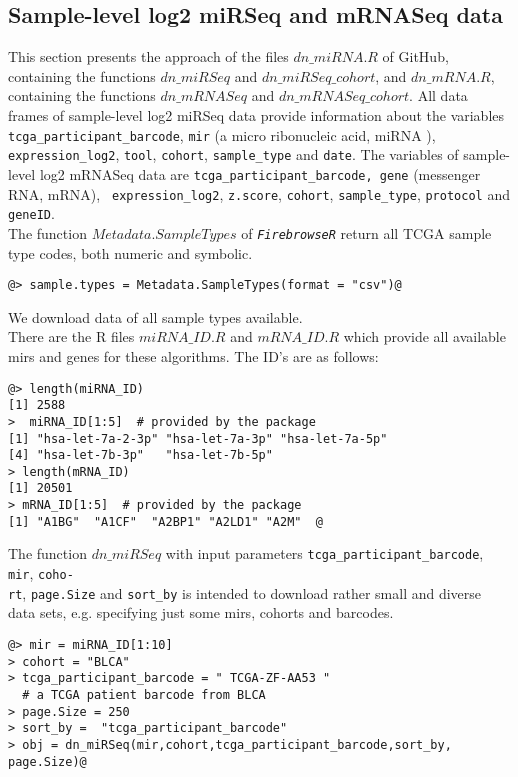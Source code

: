 \documentclass{TechReport}
\begin{document}
\subsection{Sample-level log2 miRSeq and mRNASeq data}
This section presents the approach of the files $dn\_miRNA.R$ of GitHub, containing
the functions $dn\_miRSeq$ and $dn\_miRSeq\_cohort$, and $dn\_mRNA.R$, 
containing the functions $dn\_mRNASeq$ and $dn\_mRNASeq\_cohort$. All data frames of
sample-level log2 miRSeq data provide information about the 
variables {\tt tcga\_participant\_barcode}, {\tt mir} (a micro ribonucleic acid,
miRNA ), {\tt expression\_log2}, {\tt tool}, {\tt cohort}, {\tt sample\_type} and
{\tt date}. The variables of sample-level log2 
mRNASeq data are {\tt tcga\_participant\_barcode, gene} (messenger RNA, mRNA), {\tt
expression\_log2}, {\tt z.score}, {\tt cohort}, {\tt sample\_type}, 
{\tt protocol} and {\tt geneID}.\\
The function $Metadata.SampleTypes$ of \texttt{\em FirebrowseR} return all TCGA
sample type codes, both numeric and symbolic.
\begin{lstlisting}[style=base]
@> sample.types = Metadata.SampleTypes(format = "csv")@
 \end{lstlisting}
We download data of all sample types available.\\
There are the R files $miRNA\_ID.R$ and $mRNA\_ID.R$ which provide all available
mirs and genes for these algorithms. The ID's are as follows:
\begin{lstlisting}[style=base]
@> length(miRNA_ID)
[1] 2588
>  miRNA_ID[1:5]  # provided by the package
[1] "hsa-let-7a-2-3p" "hsa-let-7a-3p" "hsa-let-7a-5p" 
[4] "hsa-let-7b-3p"   "hsa-let-7b-5p"         
> length(mRNA_ID)
[1] 20501
> mRNA_ID[1:5]  # provided by the package
[1] "A1BG"  "A1CF"  "A2BP1" "A2LD1" "A2M"  @
\end{lstlisting}
The function $dn\_miRSeq$ with input parameters  {\tt tcga\_participant\_barcode},
{\tt mir}, {\tt coho-}\\ {\tt rt}, {\tt page.Size} and {\tt sort\_by} is intended to download 
rather small and diverse data sets, e.g. specifying just some mirs, cohorts and
barcodes.
\begin{lstlisting}[style=base]
@> mir = miRNA_ID[1:10]
> cohort = "BLCA"
> tcga_participant_barcode = " TCGA-ZF-AA53 "  
  # a TCGA patient barcode from BLCA
> page.Size = 250 
> sort_by =  "tcga_participant_barcode"
> obj = dn_miRSeq(mir,cohort,tcga_participant_barcode,sort_by, 
page.Size)@
\end{lstlisting}
\end{document}
